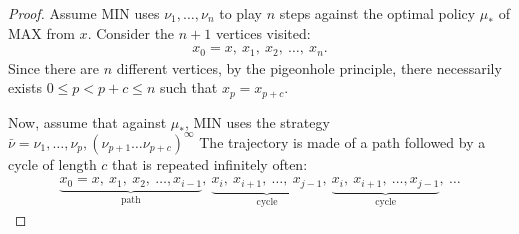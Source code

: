 \documentclass{article}
\begin{document}
\begin{proof}
  Assume MIN uses $\nu_1,\dots,\nu_n$ to play $n$ steps against the optimal policy $\mu_*$ of MAX from $x$. Consider the $n+1$ vertices visited:
  \begin{align}
    x_0=x,~ x_1,~ x_2,~ \dots,~ x_n.
  \end{align}
  Since there are $n$ different vertices, by the pigeonhole principle, there necessarily exists $0 \le p < p+c \le n$ such that $x_p=x_{p+c}$.
  
  Now, assume that against $\mu_*$, MIN uses the strategy $\bar\nu = \nu_1,\dots,\nu_p, (\nu_{p+1} \dots \nu_{p+c})^\infty$
  The trajectory is made of a path followed by a cycle of length $c$ that is repeated infinitely often:
  \begin{align}
    \underbrace{x_0=x,~ x_1,~ x_2,~ \dots, x_{i-1}}_{\mbox{path}},~ \underbrace{x_i,~ x_{i+1},~ \dots,~ x_{j-1}}_{\mbox{cycle}},~ \underbrace{x_i,~ x_{i+1},~ \dots, x_{j-1}}_{\mbox{cycle}}, ~\dots
  \end{align}


\end{proof}
\end{document}
